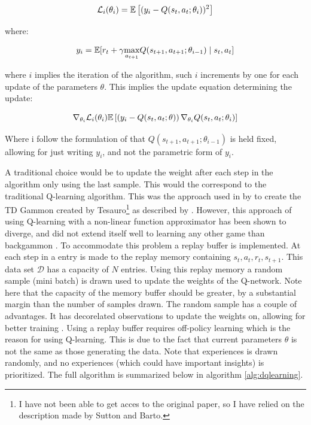 \begin{equation}
    \mathcal{L}_i(\theta_i) = \mathbb{E} \left[ (y_i - Q(s_t, a_t ; \theta_i))^2 \right]
\end{equation}

where:

\begin{equation}
    y_i = \mathbb{E} [r_t + \gamma \underset{a_{t+1}}\max Q(s_{t+1}, a_{t+1}; \theta_{i-1}) \mid s_t, a_t ]
\end{equation}

where $i$ implies the iteration of the algorithm, such $i$ increments by one for each update of the parameters $\theta$. This implies the update equation determining the update:

\begin{equation}
    \nabla_{\theta_i} \mathcal{L}_i (\theta_i)  \mathbb{E} \left[ \left( y_i - Q(s_t, a_t ; \theta) \right) \nabla_{\theta_i} Q(s_t, a_t; \theta_i) \right]
\end{equation}

Where i follow the formulation of \textcite{mnih_playing_2013} that $Q(s_{t+1}, a_{t+1}; \theta_{i-1})$ is held fixed, allowing for just writing $y_i$, and not the parametric form of $y_i$.

A traditional choice would be to update the weight after each step in the algorithm only using the last sample. This would the correspond to the traditional Q-learning algorithm. This was the approach used in by to create the TD Gammon created by Tesauro\footnote{I have not been able to get acces to the original paper, so I have relied on the description made by Sutton and Barto.} as described by \textcite{sutton_reinforcement_2018}. However, this approach of using Q-learning with a non-linear function approximator has been shown to diverge, and did not extend itself well to learning any other game than backgammon \textcite{tsitsiklis_analysis_1997}. To accommodate this problem a replay buffer is implemented. At each step in a entry is made to the replay memory containing $s_t, a_t, r_t, s_{t+1}$. This data set $\mathcal{D}$ has a capacity of $N$ entries. Using this replay memory a random sample (mini batch) is drawn used to update the weights of the Q-network. Note here that the capacity of the memory buffer should be greater, by a substantial margin than the number of samples drawn. The random sample has a couple of advantages. It has decorelated observations to update the weights on, allowing for better training \textcite{mnih_playing_2013}. Using a replay buffer requires off-policy learning which is the reason for using Q-learning. This is due to the fact that current parameters $\theta$ is not the same as those generating the data. Note that experiences is drawn randomly, and no experiences (which could have important insights) is prioritized. The full algorithm is summarized below in algorithm \ref{alg:dqlearning}.

